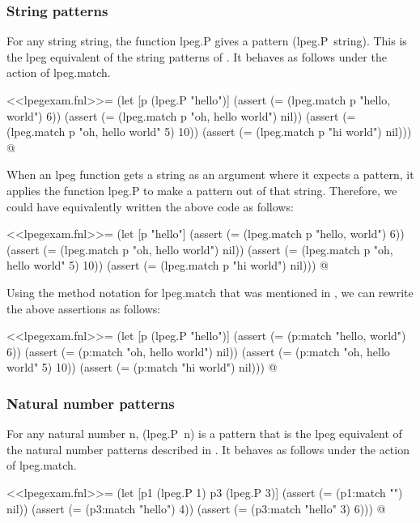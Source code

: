 \documentclass{article}
\begin{document}
\subsubsection{String patterns}
\label{sec:lk201sc6}

For any string \textsf{string}, the function \textsf{lpeg.P} gives a
pattern \textsf{(lpeg.P~string)}.  This is the \textsf{lpeg}
equivalent of the string patterns of .  It behaves
as follows under the action of \textsf{lpeg.match}.
\begin{codechunk}
<<lpegexam.fnl>>=
(let [p (lpeg.P "hello")]
  (assert (= (lpeg.match p "hello, world") 6))
  (assert (= (lpeg.match p "oh, hello world") nil))
  (assert (= (lpeg.match p "oh, hello world" 5) 10))
  (assert (= (lpeg.match p "hi world") nil)))
@
\end{codechunk}

When an \textsf{lpeg} function gets a string as an argument where it
expects a pattern, it applies the function \textsf{lpeg.P} to make a
pattern out of that string.  Therefore, we could have equivalently
written the above code as follows:
\begin{codechunk}
<<lpegexam.fnl>>=
(let [p "hello"]
  (assert (= (lpeg.match p "hello, world") 6))
  (assert (= (lpeg.match p "oh, hello world") nil))
  (assert (= (lpeg.match p "oh, hello world" 5) 10))
  (assert (= (lpeg.match p "hi world") nil)))
@
\end{codechunk}

Using the method notation for \textsf{lpeg.match} that was mentioned
in , we can rewrite the above assertions as
follows:
\begin{codechunk}
<<lpegexam.fnl>>=
(let [p (lpeg.P "hello")]
  (assert (= (p:match "hello, world") 6))
  (assert (= (p:match "oh, hello world") nil))
  (assert (= (p:match "oh, hello world" 5) 10))
  (assert (= (p:match "hi world") nil)))
@
\end{codechunk}

\subsubsection{Natural number patterns}
\label{sec:ptcsj9xp}

For any natural number \textsf{n}, \textsf{(lpeg.P~n)} is a pattern
that is the \textsf{lpeg} equivalent of the natural number patterns
described in .  It behaves as follows under the
action of \textsf{lpeg.match}.
\begin{codechunk}
<<lpegexam.fnl>>=
(let [p1 (lpeg.P 1)
      p3 (lpeg.P 3)]
  (assert (= (p1:match "") nil))
  (assert (= (p3:match "hello") 4))
  (assert (= (p3:match "hello" 3) 6)))
@
\end{codechunk}
\end{document}
